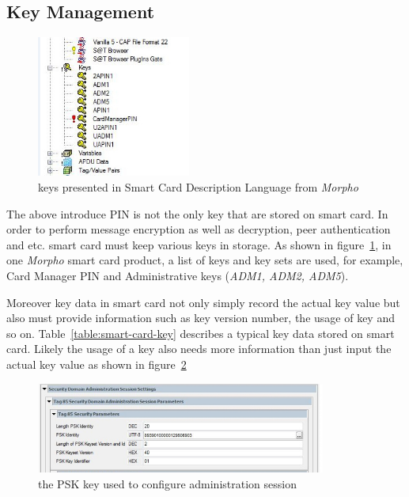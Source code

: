 \subsection{Key Management}

 \begin{figure}[!htbp]
	\centering
	\includegraphics[width=0.45\textwidth]{smart-card-key.jpg}
		\caption{keys presented in Smart Card Description Language from \emph{Morpho}}
	\label{fig:smart-card-key}
\end{figure}

The above introduce PIN is not the only key that are stored on smart card. In order to perform message encryption as well as decryption, peer authentication and etc. smart card must keep various keys in storage. As shown in figure~\ref{fig:smart-card-key}, in one \emph{Morpho} smart card product, a list of keys and key sets are used, for example, Card Manager PIN and Administrative keys (\emph{ADM1, ADM2, ADM5}).

Moreover key data in smart card not only simply record the actual key value but also must provide information such as key version number, the usage of key and so on. Table~\ref{table:smart-card-key} describes a typical key data stored on smart card. Likely the usage of a key also needs more information than just input the actual key value as shown in figure~\ref{fig:smart-card-key-use}

 \begin{figure}[!htbp]
	\centering
	\includegraphics[width=0.85\textwidth]{smart-card-key-use.jpg}
		\caption{the PSK key used to configure administration session}
	\label{fig:smart-card-key-use}
\end{figure}


